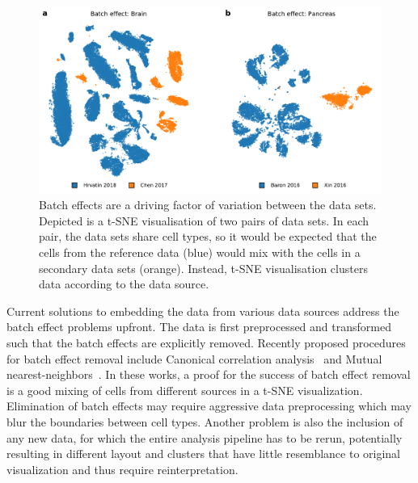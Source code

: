 \documentclass[runningheads]{llncs}
\begin{document}
\begin{figure}[htbp]
\includegraphics[width=\textwidth]{figures/batch_effect.pdf}
\caption{Batch effects are a driving factor of variation between the data sets.
Depicted is a t-SNE visualisation of two pairs of data sets. In each pair, the
data sets share cell types, so it would be expected that the cells from the
reference data (blue) would mix with the cells in a secondary data sets
(orange). Instead, t-SNE visualisation clusters data according to the data
source.} \label{fig:batch_effect}
\end{figure}

Current solutions to embedding the data from various data sources address the
batch effect problems upfront. The data is first preprocessed and
transformed such that the batch effects are explicitly
removed. Recently proposed procedures for batch effect removal include
Canonical correlation analysis~\cite{cca} and Mutual
nearest-neighbors~\cite{mnn,seurat}. In these works, a proof for the success of
batch effect removal is a good mixing of cells from different sources in a
t-SNE visualization. Elimination of batch effects may require aggressive data
preprocessing which may blur the boundaries between cell types. Another problem
is also the inclusion of any new data, for which the entire analysis
pipeline has to be rerun, potentially resulting in different layout and clusters
that have little resemblance to original visualization and thus require
reinterpretation.
\end{document}
